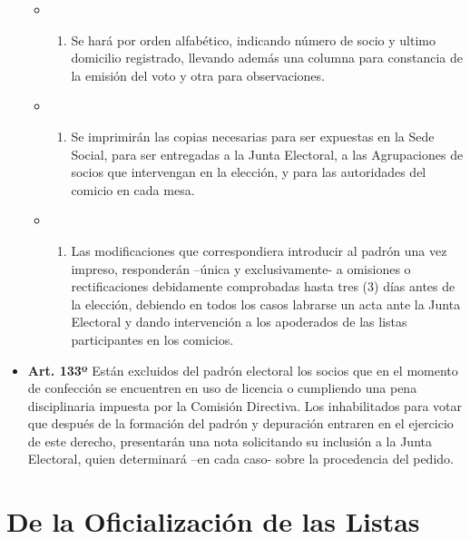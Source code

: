 \documentclass[]{book}
\providecommand{\tightlist}{%
  \setlength{\itemsep}{0pt}\setlength{\parskip}{0pt}}
\begin{document}
\begin{itemize}
  \begin{itemize}
  \item
    \begin{enumerate}
    \def\labelenumi{\alph{enumi})}
    \tightlist
    \item
      Se hará por orden alfabético, indicando número de socio y ultimo
      domicilio registrado, llevando además una columna para constancia
      de la emisión del voto y otra para observaciones.
    \end{enumerate}
  \item
    \begin{enumerate}
    \def\labelenumi{\alph{enumi})}
    \setcounter{enumi}{1}
    \tightlist
    \item
      Se imprimirán las copias necesarias para ser expuestas en la Sede
      Social, para ser entregadas a la Junta Electoral, a las
      Agrupaciones de socios que intervengan en la elección, y para las
      autoridades del comicio en cada mesa.
    \end{enumerate}
  \item
    \begin{enumerate}
    \def\labelenumi{\alph{enumi})}
    \setcounter{enumi}{2}
    \tightlist
    \item
      Las modificaciones que correspondiera introducir al padrón una vez
      impreso, responderán --única y exclusivamente- a omisiones o
      rectificaciones debidamente comprobadas hasta tres (3) días antes
      de la elección, debiendo en todos los casos labrarse un acta ante
      la Junta Electoral y dando intervención a los apoderados de las
      listas participantes en los comicios.
    \end{enumerate}
  \end{itemize}
\item
  \textbf{Art. 133º} Están excluidos del padrón electoral los socios que
  en el momento de confección se encuentren en uso de licencia o
  cumpliendo una pena disciplinaria impuesta por la Comisión Directiva.
  Los inhabilitados para votar que después de la formación del padrón y
  depuración entraren en el ejercicio de este derecho, presentarán una
  nota solicitando su inclusión a la Junta Electoral, quien determinará
  --en cada caso- sobre la procedencia del pedido.
\end{itemize}

\section{De la Oficialización de las
Listas}\label{de-la-oficializacion-de-las-listas}
\end{document}
